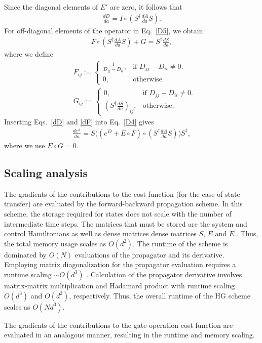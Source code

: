 \documentclass[12pt]{article}
\begin{document}
Since the diagonal elements of $E'$ are zero, it follows that
\begin{align}
\label{dD}
    \frac{dD}{da}=I\circ (S^\dagger\frac{dA}{da}S).
\end{align}
For off-diagonal elements of the operator in Eq.\ \eqref{D5}, we obtain
\begin{align}
\label{dF}
    F\circ (S^\dagger\frac{dA}{da}S)+G=S^\dagger\frac{dS}{da},
\end{align}
where we define 
\begin{align}
    &F_{ij}:=
  \begin{cases}
    \frac{1}{D_{jj}-D_{ii}},& \text{if $D_{jj}-D_{ii} \neq 0$}.\\
    0, & \text{otherwise}.
  \end{cases}\\
\nonumber  &G_{ij}:=
  \begin{cases}
    0, & \text{if $D_{jj}-D_{ii} \neq 0$}.\\
    (S^\dagger\frac{dS}{da})_{ij}, & \text{otherwise}.
\end{cases}
\end{align}
Inserting Eqs.\ \eqref{dD} and \eqref{dF} into Eq.\ \eqref{D4} gives
\begin{align}
\label{propagator der}
    \frac{de^A}{da}=S\big((e^D+E \circ F)\circ(S^\dagger \frac{dA}{da}S)\big)S^\dagger,
\end{align}
where we use $E\circ G=0$. 
\subsection{Scaling analysis }
The gradients of the contributions to the cost function (for the case of state transfer) are evaluated by the forward-backward propagation scheme. In this scheme, the storage required for states does not scale with the number of intermediate time steps. The matrices that must be stored are the system and control Hamiltonians as well as dense matrices dense matrices $S$, $E$ and $E^\prime$. Thus, the total memory usage scales as $O(d^2)$. The runtime of the scheme is dominated by $O(N)$ evaluations of the propagator and its derivative. Employing matrix diagonalization for the propagator evaluation requires a runtime scaling $\sim O(d^3)$ \cite{matridiagcomppan1999complexity}. Calculation of the propagator derivative involves matrix-matrix multiplication and Hadamard product with runtime scaling $O(d^3)$ and $O(d^2)$, respectively. Thus, the overall runtime of the HG scheme scales as $O(Nd^3)$. 

The gradients of the contributions to the gate-operation cost function are evaluated in an analogous manner, resulting in the runtime and memory scaling.



\end{document}
